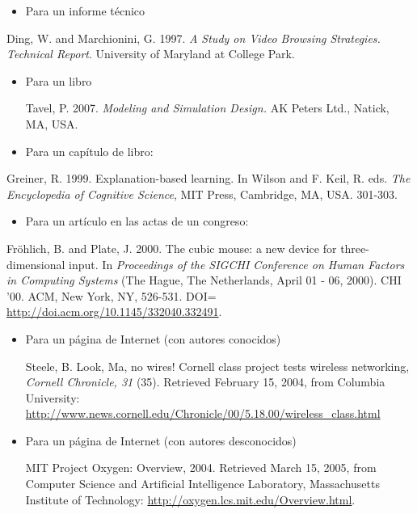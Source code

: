 \documentclass[a4paper]{article}
\newcommand\liststyleLii{%
\renewcommand\labelitemi{{\textbullet}}
\renewcommand\labelitemii{${\circ}$}
\renewcommand\labelitemiii{${\blacksquare}$}
\renewcommand\labelitemiv{{\textbullet}}
}
\newcommand\liststyleLiii{%
\renewcommand\labelitemi{{\textbullet}}
\renewcommand\labelitemii{${\circ}$}
\renewcommand\labelitemiii{${\blacksquare}$}
\renewcommand\labelitemiv{{\textbullet}}
}
\newcommand\liststyleLiv{%
\renewcommand\labelitemi{{\textbullet}}
\renewcommand\labelitemii{${\circ}$}
\renewcommand\labelitemiii{${\blacksquare}$}
\renewcommand\labelitemiv{{\textbullet}}
}
\newcommand\liststyleLv{%
\renewcommand\labelitemi{{\textbullet}}
\renewcommand\labelitemii{${\circ}$}
\renewcommand\labelitemiii{${\blacksquare}$}
\renewcommand\labelitemiv{{\textbullet}}
}
\newcommand\liststyleLvi{%
\renewcommand\labelitemi{{\textbullet}}
\renewcommand\labelitemii{${\circ}$}
\renewcommand\labelitemiii{${\blacksquare}$}
\renewcommand\labelitemiv{{\textbullet}}
}
\begin{document}
\liststyleLii
\begin{itemize}
\item Para un informe t\'ecnico
\end{itemize}
Ding, W. and Marchionini, G. 1997. \textit{A Study on Video Browsing Strategies. Technical Report}. University of
Maryland at College Park.

\liststyleLiii
\begin{itemize}
\item Para un libro

Tavel, P. 2007. \textit{Modeling and Simulation Design.} AK Peters Ltd., Natick, MA, USA.
\end{itemize}
\liststyleLiv
\begin{itemize}
\item Para un cap\'itulo de libro:
\end{itemize}
Greiner, R. 1999. Explanation-based learning. In Wilson and F. Keil, R. eds. \textit{The Encyclopedia of Cognitive
Science}, MIT Press, Cambridge, MA, USA. 301-303.

\liststyleLv
\begin{itemize}
\item Para un art\'iculo en las actas de un congreso:
\end{itemize}
Fr\"ohlich, B. and Plate, J. 2000. The cubic mouse: a new device for three-dimensional input. In \textit{Proceedings of
the SIGCHI Conference on Human Factors in Computing Systems} (The Hague, The Netherlands, April 01 - 06, 2000). CHI
'00. ACM, New York, NY, 526-531. DOI= \url{http://doi.acm.org/10.1145/332040.332491}.

\liststyleLvi
\begin{itemize}
\item Para un p\'agina de Internet (con autores conocidos)

Steele, B. Look, Ma, no wires! Cornell class project tests wireless networking, \textit{Cornell Chronicle, 31 }(35).
Retrieved February 15, 2004, from Columbia University:
\url{http://www.news.cornell.edu/Chronicle/00/5.18.00/wireless_class.html}
\item Para un p\'agina de Internet (con autores desconocidos)

MIT Project Oxygen: Overview, 2004. Retrieved March 15, 2005, from Computer Science and Artificial Intelligence
Laboratory, Massachusetts Institute of Technology: \url{http://oxygen.lcs.mit.edu/Overview.html}. \
\end{itemize}

\bigskip
\end{document}
